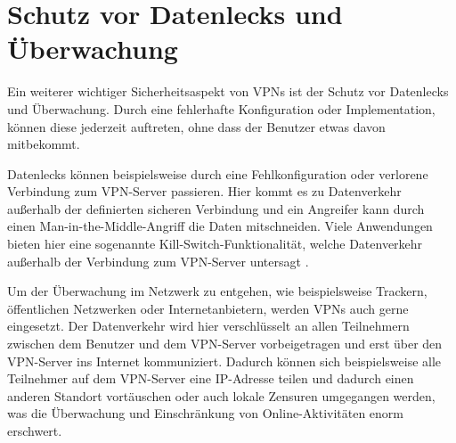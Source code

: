 \section{Schutz vor Datenlecks und Überwachung}

Ein weiterer wichtiger Sicherheitsaspekt von \gls{VPN}s ist der Schutz vor Datenlecks und Überwachung. Durch eine fehlerhafte Konfiguration oder Implementation, können diese jederzeit auftreten, ohne dass der Benutzer etwas davon mitbekommt.

Datenlecks können beispielsweise durch eine Fehlkonfiguration oder verlorene Verbindung zum \gls{VPN}-Server passieren. Hier kommt es zu Datenverkehr außerhalb der definierten sicheren Verbindung und ein Angreifer kann durch einen Man-in-the-Middle-Angriff die Daten mitschneiden. Viele Anwendungen bieten hier eine sogenannte Kill-Switch-Funktionalität, welche Datenverkehr außerhalb der Verbindung zum \gls{VPN}-Server untersagt \cite{OpenVPN_KillSwitch, NordVPN_KillSwitch}.

Um der Überwachung im Netzwerk zu entgehen, wie beispielsweise Trackern, öffentlichen Netzwerken oder Internetanbietern, werden \gls{VPN}s auch gerne eingesetzt. Der Datenverkehr wird hier verschlüsselt an allen Teilnehmern zwischen dem Benutzer und dem \gls{VPN}-Server vorbeigetragen und erst über den \gls{VPN}-Server ins Internet kommuniziert. Dadurch können sich beispielsweise alle Teilnehmer auf dem \gls{VPN}-Server eine IP-Adresse teilen und dadurch einen anderen Standort vortäuschen oder auch lokale Zensuren umgegangen werden, was die Überwachung und Einschränkung von Online-Aktivitäten enorm erschwert.

